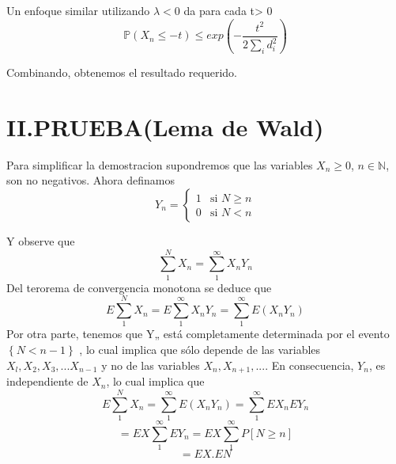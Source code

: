 \documentclass[letterpaper, 10 pt, conference]{ieeeconf}  %
\begin{document}
Un enfoque similar utilizando $\lambda <0$ da   para cada t> 0
\[\mathbb{P}(X_{n}\leq -t)\leq exp\left( -\dfrac{t^2}{2\sum_{i}d_{i}^{2}}\right)\]

Combinando, obtenemos el resultado requerido.
\section*{II.PRUEBA(Lema de Wald)}
Para simplificar la demostracion supondremos que las variables $X_{n}\geq0$, $n\in \mathbb{N}$, son no negativos. Ahora definamos \\
$$ Y_{n} = \left \{ \begin{matrix} 1 & \mbox{si } N\geq n
\\ 0 & \mbox{si } N<n\end{matrix}\right. $$

Y observe que \\
$$\sum_1^{N}X_{n}=\sum_1^{\infty}X_{n}Y_{n}$$
Del terorema de convergencia monotona se deduce que $$E\sum_1^{N}X_{n}=E\sum_1^{\infty}X_{n}Y_{n}=\sum_1^{\infty}E(X_{n}Y_{n})$$
Por otra parte, tenemos que Y„ está completamente determinada por el evento
$\left\lbrace{N < n-1}\right\rbrace$ , lo cual implica que sólo depende de las variables $X_{l}, X_{2}, X_{3}, ... X_{n-1}$
y no de las variables $X_{n}, X_{n+1}, ...$. En consecuencia, $Y_{n}$, es independiente
de $X_{n}$, lo cual implica que $$E\sum_1^{N}X_{n}=\sum_1^{\infty}E(X_{n}Y_{n})=\sum_1^{\infty}EX_{n}EY_{n}$$
$$=EX\sum_1^{\infty}EY_{n}=EX\sum_1^{\infty}P[N\geq n]$$
$$=EX.EN$$




\newpage
\end{document}
